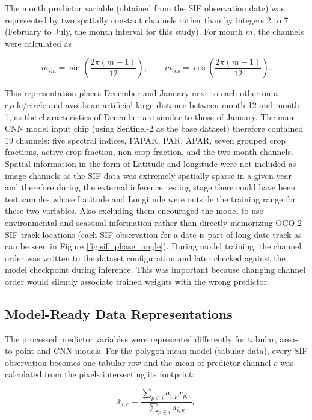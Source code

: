 The month predictor variable (obtained from the SIF observation date) was represented by two spatially constant channels rather than by integers 2 to 7 (February to July, the month interval for this study). For month $m$, the channels were calculated as

\begin{equation}
    m_{\sin}=\sin\!\left(\frac{2\pi(m-1)}{12}\right),\qquad
    m_{\cos}=\cos\!\left(\frac{2\pi(m-1)}{12}\right).
    \label{eq:cyclical_month}
\end{equation}

This representation places December and January next to each other on a cycle/circle and avoids an artificial large distance between month 12 and month 1, as the characteristics of December are similar to those of January. The main CNN model input chip (using Sentinel-2 as the base dataset) therefore contained 19 channels: five spectral indices, FAPAR, PAR, APAR, seven grouped crop fractions, active-crop fraction, non-crop fraction, and the two month channels. Spatial information in the form of Latitude and longitude were not included as image channels as the SIF data was extremely spatially sparse in a given year and therefore during the external inference testing stage there could have been test samples whose Latitude and Longitude were outside the training range for these two variables. Also excluding them encouraged the model to use environmental and seasonal information rather than directly memorizing OCO-2 SIF track locations (each SIF observation for a date is part of long date track as can be seen in Figure \ref{fig:sif_phase_angle}). During model training, the channel order was written to the dataset configuration and later checked against the model checkpoint during inference. This was important because changing channel order would silently associate trained weights with the wrong predictor. 



\subsection{Model-Ready Data Representations}

The processed predictor variables were represented differently for tabular, area-to-point and CNN models. For the polygon mean model (tabular data), every SIF observation becomes one tabular row and the mean of predictor channel $c$ was calculated from the pixels intersecting its footprint:

\begin{equation}
    \bar{x}_{i,c}=
    \frac{\sum_{p\in i}a_{i,p}x_{p,c}}
         {\sum_{p\in i}a_{i,p}},
    \label{eq:polygon_weighted_mean}
\end{equation}

